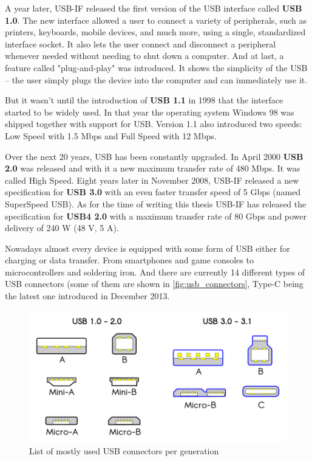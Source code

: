 A year later, USB-IF released the first version of the USB interface called \textbf{USB 1.0}. The new interface allowed a user to connect a variety of peripherals, such as printers, keyboards, mobile devices, and much more, using a single, standardized interface socket. It also lets the user connect and disconnect a peripheral whenever needed without needing to shut down a computer. And at last, a feature called "plug-and-play" was introduced. It shows the simplicity of the USB \--- the user simply plugs the device into the computer and can immediately use it. 

But it wasn't until the introduction of \textbf{USB 1.1} in 1998 that the interface started to be widely used. In that year the operating system Windows 98 was shipped together with support for USB. Version 1.1 also introduced two speeds: Low Speed with 1.5 Mbps and Full Speed with 12 Mbps.

Over the next 20 years, USB has been constantly upgraded. In April 2000 \textbf{USB 2.0} was released and with it a new maximum transfer rate of 480 Mbps. It was called High Speed. Eight years later in November 2008, USB-IF released a new specification for \textbf{USB 3.0} with an even faster transfer speed of 5 Gbps (named SuperSpeed USB). As for the time of writing this thesis USB-IF has released the specification for \textbf{USB4 2.0} with a maximum transfer rate of 80 Gbps and power delivery of 240 W (48 V, 5 A).

Nowadays almost every device is equipped with some form of USB either for charging or data transfer. From smartphones and game consoles to microcontrollers and soldering iron. And there are currently 14 different types of USB connectors (some of them are shown in \autoref{fig:usb_connectors}, Type-C being the latest one introduced in December 2013.

\begin{figure}[ht]
    \centering
    \includegraphics{obrazky-figures/USB_2.0_and_3.0_connectors.png}
    \caption{List of mostly used USB connectors per generation}
    \label{fig:usb_connectors}
\end{figure}

